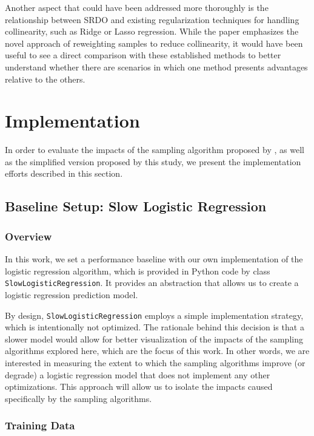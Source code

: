 \documentclass{article}
\theoremstyle{plain}
\theoremstyle{definition}
\theoremstyle{remark}
\begin{document}
Another aspect that could have been addressed more thoroughly is the relationship between SRDO and existing regularization techniques for handling collinearity, such as Ridge or Lasso regression. While the paper emphasizes the novel approach of reweighting samples to reduce collinearity, it would have been useful to see a direct comparison with these established methods to better understand whether there are scenarios in which one method presents advantages relative to the others.


\section{Implementation}

In order to evaluate the impacts of the sampling algorithm proposed by \citeauthor{chow24} \cite{chow24}, as well as the simplified version proposed by this study, we present the implementation efforts described in this section.

\subsection{Baseline Setup: Slow Logistic Regression}

\subsubsection{Overview}

In this work, we set a performance baseline with our own implementation of the logistic regression algorithm, which is provided in Python code by class \texttt{SlowLogisticRegression}. It provides an abstraction that allows us to create a logistic regression prediction model.

By design, \texttt{SlowLogisticRegression} employs a simple implementation strategy, which is intentionally not optimized. The rationale behind this decision is that a slower model would allow for better visualization of the impacts of the sampling algorithms explored here, which are the focus of this work. In other words, we are interested in measuring the extent to which the sampling algorithms improve (or degrade) a logistic regression model that does not implement any other optimizations. This approach will allow us to isolate the impacts caused specifically by the sampling algorithms.


\subsubsection{Training Data}
\end{document}
